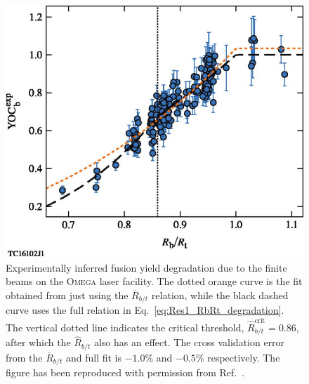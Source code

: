 \begin{figure}[t!]
    \includegraphics[width=0.7\linewidth]{Results1/Images/RbRt_degradation_Lees.jpeg}
    \centering
    \caption{Experimentally inferred fusion yield degradation due to the finite beams on the \textsc{Omega} laser facility.
    The dotted orange curve is the fit obtained from just using the $\overline{R}_{b/t}$ relation, while the black dashed curve uses the full relation in Eq.~\ref{eq:Res1_RbRt_degradation}.
    The vertical dotted line indicates the critical threshold, $\hat{R}_{b/t}^{\text{crit}}=0.86$, after which the $\hat{R}_{b/t}$ also has an effect.
    The cross validation error from the $\overline{R}_{b/t}$ and full fit is $-1.0\%$ and $-0.5\%$ respectively.
    The figure has been reproduced with permission from Ref.~\cite{lees_understanding_2023}.}%
    \label{fig:RbRt_YOC_lees}
\end{figure}

